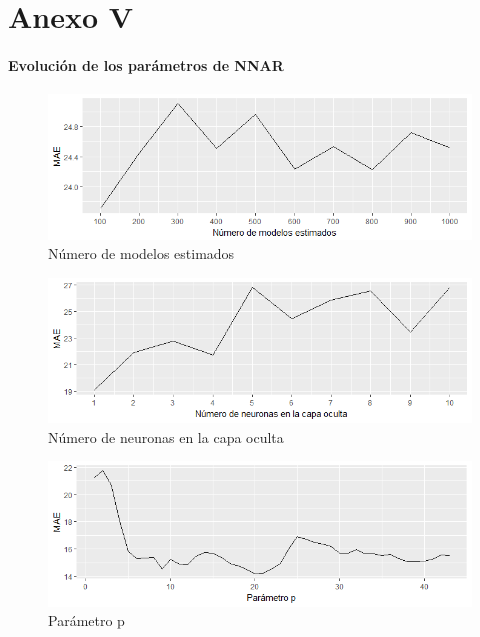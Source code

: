 \documentclass[12pt,a4paper,oneside]{article}
\begin{document}
\part*{Anexo V}

\subsection*{Evolución de los parámetros de NNAR}

\vspace*{3\baselineskip}
\vspace*{1\baselineskip}
\begin{figure} [h]
    \centering
    \centerline{\includegraphics[scale = 0.7]{Images/modelos.png}}
    \caption{Número de modelos estimados}
    \label{red}
\end{figure}
\begin{figure} [h]
    \centering
    \centerline{\includegraphics[scale = 0.7]{Images/neuronas.png}}
    \caption{Número de neuronas en la capa oculta}
    \label{red}
\end{figure}
\begin{figure} [h]
    \centering
    \centerline{\includegraphics[scale = 0.7]{Images/p.png}}
    \caption{Parámetro p}
    \label{red}
\end{figure}
\end{document}
